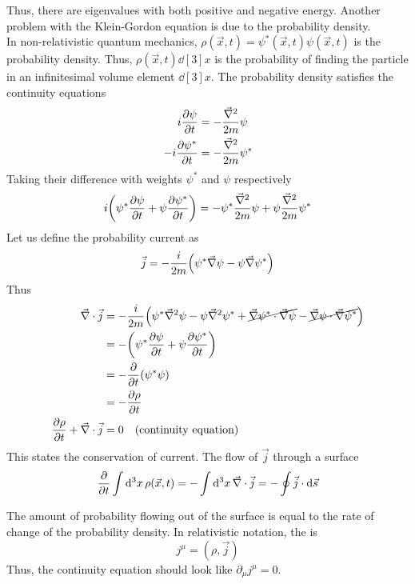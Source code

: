 \documentclass[12pt,a4paper,titlepage]{article}
\newcommand{\ul}[1]{\underline{\smash{#1}}} %
\newcommand{\pd}[1]{\partial_{#1}} %
\begin{document}
Thus, there are eigenvalues with both positive and negative energy. Another problem with the Klein-Gordon equation is due to the probability density.\\

In non-relativistic quantum mechanics, $\rho(\vec{x},t)=\psi^{*}(\vec{x},t)\psi(\vec{x},t)$ is the probability density. Thus, $\rho(\vec{x},t)\dd[3]{x}$ is the probability of finding the particle in an infinitesimal volume element $\dd[3]{x}$. The probability density satisfies the continuity equations
\begin{equation}
\begin{aligned}
i\pdv{\psi}{t}&=-\frac{\vec{\nabla}^{2}}{2m}\psi\\
-i\pdv{\psi^{*}}{t}&=-\frac{\vec{\nabla}^{2}}{2m}\psi^{*}
\end{aligned}
\end{equation}
Taking their difference with weights $\psi^{*}$ and $\psi$ respectively
\begin{equation}
i\qty(\psi^{*}\pdv{\psi}{t}+\psi\pdv{\psi^{*}}{t})=-\psi^{*}\frac{\vec{\nabla}^{2}}{2m}\psi+\psi\frac{\vec{\nabla}^{2}}{2m}\psi^{*}
\end{equation}
Let us define the probability current as
\begin{equation}
\vec{j}=-\frac{i}{2m}\qty(\psi^{*}\vec{\nabla}\psi-\psi\vec{\nabla}\psi^{*})
\end{equation}
Thus
\begin{equation}
\begin{aligned}
\vec{\nabla}\cdot\vec{j}&=-\frac{i}{2m}\qty(\psi^{*}\vec{\nabla}^{2}\psi-\psi\vec{\nabla}^{2}\psi^{*}+\cancel{\vec{\nabla}\psi^{*}\cdot\vec{\nabla}\psi}-\cancel{\vec{\nabla}\psi\cdot\vec{\nabla}\psi^{*}})\\
&=-\qty(\psi^{*}\pdv{\psi}{t}+\psi\pdv{\psi^{*}}{t})\\
&=-\pdv{t}\qty(\psi^{*}\psi)\\
&=-\pdv{\rho}{t}\\
\pdv{\rho}{t}+\vec{\nabla}\cdot\vec{j}&=0\qq{(continuity equation)}
\end{aligned}
\end{equation}
This states the conservation of current. The flow of $\vec{j}$ through a surface 
\begin{equation}
\pdv{t}\int\dd[3]{x}\rho(\vec{x},t)=-\int\dd[3]{x}\vec{\nabla}\cdot\vec{j}=-\oint\vec{j}\cdot\dd{\vec{s}}
\end{equation}
\begin{center}
\end{center}
The amount of probability flowing out of the surface is equal to the rate of change of the probability density. In relativistic notation, the \ul{4-current} is
\begin{equation}
j^{\mu}=(\rho,\vec{j})
\end{equation}
Thus, the continuity equation should look like $\pd{\mu}j^{\mu}=0$.\\
\end{document}
